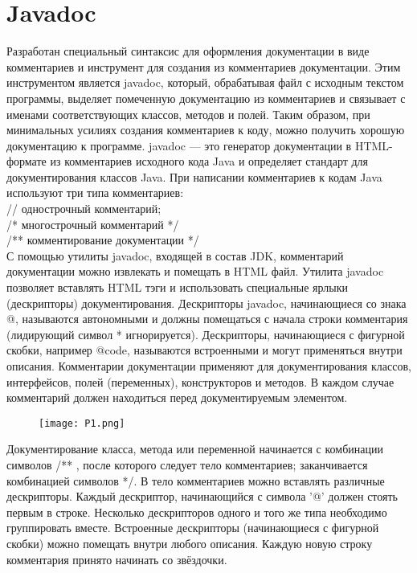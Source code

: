 \section{Javadoc} 
\noindent Разработан специальный синтаксис для оформления документации в виде комментариев и инструмент для создания из комментариев документации. Этим инструментом является javadoc, который, обрабатывая файл с исходным текстом программы, выделяет помеченную документацию из комментариев и связывает с именами соответствующих классов, методов и полей. Таким образом, при минимальных усилиях создания комментариев к коду, можно получить хорошую документацию к программе. javadoc — это генератор документации в HTML-формате из комментариев исходного кода Java и определяет стандарт для документирования классов Java. При написании комментариев к кодам Java используют три типа комментариев: \\
// однострочный комментарий; \\
/* многострочный комментарий */ \\
/** комментирование документации */ \\
С помощью утилиты javadoc, входящей в состав JDK, комментарий документации можно извлекать и помещать в HTML файл. Утилита javadoc позволяет вставлять HTML тэги и использовать специальные ярлыки (дескрипторы) документирования. Дескрипторы javadoc, начинающиеся со знака @, называются автономными и должны помещаться с начала строки комментария (лидирующий символ * игнорируется). Дескрипторы, начинающиеся с фигурной скобки, например {@code}, называются встроенными и могут применяться внутри описания. Комментарии документации применяют для документирования классов, интерфейсов, полей (переменных), конструкторов и методов. В каждом случае комментарий должен находиться перед документируемым элементом. \\
\begin{figure}[H]
    \centering
    \texttt{[image: P1.png]}
\end{figure}
\noindent Документирование класса, метода или переменной начинается с комбинации символов /** , после которого следует тело комментариев; заканчивается комбинацией символов */. В тело комментариев можно вставлять различные дескрипторы. Каждый дескриптор, начинающийся с символа '@' должен стоять первым в строке. Несколько дескрипторов одного и того же типа необходимо группировать вместе. Встроенные дескрипторы (начинающиеся с фигурной скобки) можно помещать внутри любого описания. Каждую новую строку комментария принято начинать со звёздочки.

